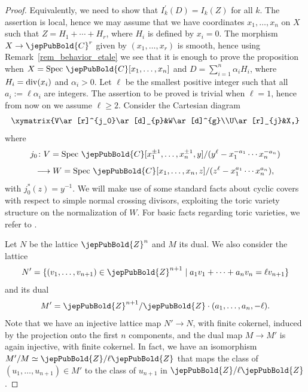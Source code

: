 \begin{proof}
Equivalently, we need to show that $I_k^\prime (D) = I_k(Z)$ for all $k$. The assertion is local, hence we may assume that we have coordinates $x_1,\ldots,x_n$
on $X$ such that $Z=H_1+\cdots+H_r$, where $H_i$ is defined by $x_i=0$. The morphism $X\to \jepPubBold{C}^r$ given by 
$(x_1,\ldots,x_r)$ is smooth, hence
using Remark~\ref{rem_behavior_etale} we see that it is enough to prove the proposition when 
$X= \operatorname{Spec}\,\jepPubBold{C}[x_1,\ldots,x_n]$ and $D=\sum_{i=1}^n\alpha_iH_i$,
where $H_i= {\rm div}(x_i)$ and $\alpha_i>0$. Let $\ell$ be the smallest positive integer such that all $a_i:=\ell\alpha_i$ are integers. The assertion to be proved is trivial 
when $\ell=1$, hence from now on we assume $\ell\geqslant 2$. 
Consider the Cartesian diagram 
$$
{\def\labelstyle{\textstyle}\xymatrix{V\ar[r]^{j_0}\ar[d]_{p}&W\ar[d]^{g}\\U\ar[r]_{j}&X,}}
$$
where 
$$j_0\colon V=\operatorname{Spec}\,\jepPubBold{C}[x_1^{\pm 1},\ldots,x_n^{\pm 1},y]/(y^{\ell}-x_1^{-a_1}\cdots x_n^{-a_n})$$
$$\longrightarrow W=\operatorname{Spec}\,\jepPubBold{C}[x_1,\ldots,x_n,z]/(z^{\ell}-x_1^{a_1}\cdots x_n^{a_n}),$$
with $j_0^*(z)=y^{-1}$. 
We will make use of some standard facts about cyclic covers with respect to simple normal crossing divisors,
exploiting the toric variety structure on the normalization of $W$. For basic facts regarding toric varieties, 
we refer to 
\cite{Fulton}.



Let $N$ be the lattice $\jepPubBold{Z}^n$ and $M$ its dual. We also consider the lattice 
$$N'=\{(v_1,\ldots,v_{n+1})\in\jepPubBold{Z}^{n+1}\mid a_1v_1+\cdots+a_nv_n=\ell v_{n+1}\}$$
and its dual 
$$M'=\jepPubBold{Z}^{n+1}/\jepPubBold{Z}\cdot (a_1,\ldots,a_n,-\ell).$$
Note that we have an injective lattice map $N'\to N$, with finite cokernel, induced by the projection onto the first $n$ components, and the dual map $M\to M'$
is again injective, with finite cokernel. In fact, we have an isomorphism $M'/M\simeq\jepPubBold{Z}/ \ell\jepPubBold{Z}$ that maps the class of $(u_1,\ldots,u_{n+1})\in M'$
to the class of $u_{n+1}$ in $\jepPubBold{Z}/\ell \jepPubBold{Z}$. 


\end{proof}
